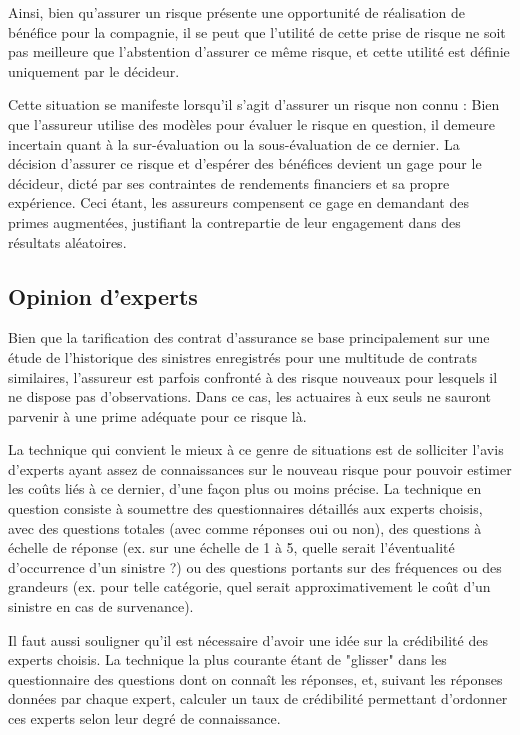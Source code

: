 \documentclass[11pt]{article}
\begin{document}
Ainsi, bien qu'assurer un risque présente une opportunité de réalisation de bénéfice pour la compagnie, il se peut que l'utilité de cette prise de risque ne soit pas meilleure que l'abstention d'assurer ce même risque, et cette utilité est définie uniquement par le décideur. 

Cette situation se manifeste lorsqu'il s'agit d'assurer un risque non connu : Bien que l'assureur utilise des modèles pour évaluer le risque en question, il demeure incertain quant à la sur-évaluation ou la sous-évaluation de ce dernier. La décision d'assurer ce risque et d'espérer des bénéfices devient un gage pour le décideur, dicté par ses contraintes de rendements financiers et sa propre expérience. Ceci étant, les assureurs compensent ce gage en demandant des primes augmentées, justifiant la contrepartie de leur engagement dans des résultats aléatoires.

\subsection{Opinion d'experts}

Bien que la tarification des contrat d'assurance se base principalement sur une étude de l'historique des sinistres enregistrés pour une multitude de contrats similaires, l'assureur est parfois confronté à des risque nouveaux pour lesquels il ne dispose pas d'observations. Dans ce cas, les actuaires à eux seuls ne sauront parvenir à une prime adéquate pour ce risque là. 

La technique qui convient le mieux à ce genre de situations est de solliciter l'avis d'experts ayant assez de connaissances sur le nouveau risque pour pouvoir estimer les coûts liés à ce dernier, d'une façon plus ou moins précise. La technique en question consiste à soumettre des questionnaires détaillés aux experts choisis, avec des questions totales (avec comme réponses oui ou non), des questions à échelle de réponse (ex. sur une échelle de 1 à 5, quelle serait l'éventualité d'occurrence d'un sinistre ?) ou des questions portants sur des fréquences ou des grandeurs (ex. pour telle catégorie, quel serait approximativement le coût d'un sinistre en cas de survenance).

Il faut aussi souligner qu'il est nécessaire d'avoir une idée sur la crédibilité des experts choisis. La technique la plus courante étant de "glisser" dans les questionnaire des questions dont on connaît les réponses, et, suivant les réponses données par chaque expert, calculer un taux de crédibilité permettant d'ordonner ces experts selon leur degré de connaissance.
\end{document}

